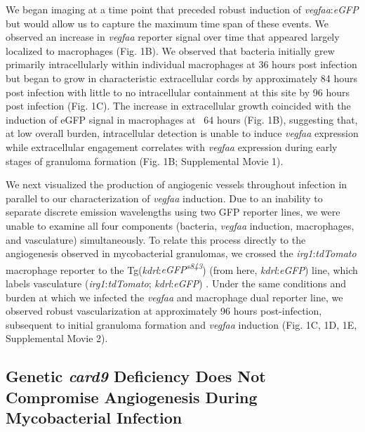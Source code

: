 We began imaging at a time point that preceded robust induction of \textit{vegfaa}:\textit{eGFP} but would allow us to capture the maximum time span of these events. We observed an increase in \textit{vegfaa} reporter signal over time that appeared largely localized to macrophages (Fig. 1B). We observed that bacteria initially grew primarily intracellularly within individual macrophages at 36 hours post infection but began to grow in characteristic extracellular cords by approximately 84 hours post infection with little to no intracellular containment at this site by 96 hours post infection (Fig. 1C). The increase in extracellular growth coincided with the induction of eGFP signal in macrophages at ~64 hours (Fig. 1B), suggesting that, at low overall burden, intracellular detection is unable to induce \textit{vegfaa} expression while extracellular engagement correlates with \textit{vegfaa} expression during early stages of granuloma formation (Fig. 1B; Supplemental Movie 1). 

We next visualized the production of angiogenic vessels throughout infection in parallel to our characterization of \textit{vegfaa} induction. Due to an inability to separate discrete emission wavelengths using two GFP reporter lines, we were unable to examine all four components (bacteria, \textit{vegfaa} induction, macrophages, and vasculature) simultaneously. To relate this process directly to the angiogenesis observed in mycobacterial granulomas, we crossed the \textit{irg1}:\textit{tdTomato} macrophage reporter to the Tg(\textit{kdrl}:\textit{eGFP\textsuperscript{s843}}) (from here, \textit{kdrl}:\textit{eGFP}) line, which labels vasculature (\textit{irg1}:\textit{tdTomato}; \textit{kdrl}:\textit{eGFP}) \citep{Jin2005}. Under the same conditions and burden at which we infected the \textit{vegfaa} and macrophage dual reporter line, we observed robust vascularization at approximately 96 hours post-infection, subsequent to initial granuloma formation and \textit{vegfaa} induction (Fig. 1C, 1D, 1E, Supplemental Movie 2). 

\subsection{Genetic \textit{card9} Deficiency Does Not Compromise Angiogenesis During Mycobacterial Infection}

